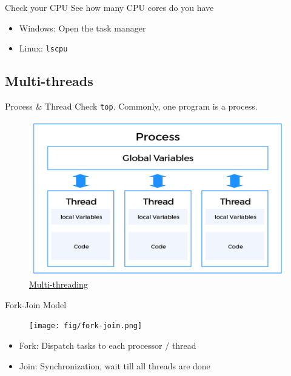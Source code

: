 \documentclass{../TexTemplate/myslide}
\begin{document}
\begin{frame}[fragile]{Check your CPU}
See how many CPU cores do you have
\begin{itemize}
\item Windows: Open the task manager
\item Linux: \verb'lscpu'
\end{itemize}
\end{frame}

\subsection{Multi-threads}
\begin{frame}
\subsectionpage
\end{frame}

\begin{frame}[fragile]{Process \& Thread}
Check \verb'top'. Commonly, one program is a process.
\begin{figure}
\centering
\includegraphics[width=0.8\linewidth]{fig/process_thread.png}
\caption*{\small \href{https://www.educative.io/courses/java-multithreading-for-senior-engineering-interviews/m2G48X18NDO}{Multi-threading}}
\end{figure}
\end{frame}

\begin{frame}{Fork-Join Model}
\begin{figure}
\centering
\texttt{[image: fig/fork-join.png]}
\end{figure}
\begin{itemize}
	\item Fork: Dispatch tasks to each processor / thread
	\item Join: Synchronization, wait till all threads are done
\end{itemize}
\end{frame}
\end{document}
